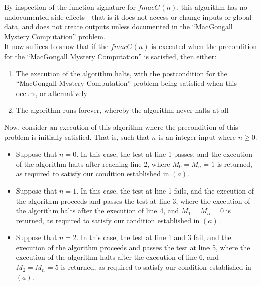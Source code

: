 \documentclass[12pt]{article}
\newenvironment{problem}[2][Problem]{\begin{trivlist}
\item[\hskip \labelsep {\bfseries #1}\hskip \labelsep {\bfseries #2.}]}{\end{trivlist}}
\begin{document}

\begin{problem}{8}

\noindent
By inspection of the function signature for $fmacG(n)$, this algorithm has no undocumented side effects - that is it does not access or change inputs or global data, and does not create outputs unless documented in the “MacGongall Mystery Computation” problem. \\

\noindent
It now suffices to show that if the $fmacG(n)$ is executed when the precondition for the “MacGongall Mystery Computation” is satisfied, then either:
\begin{enumerate}[label=(\alph*)]
\item The execution of the algorithm halts, with the postcondition for the “MacGongall Mystery Computation” problem being satisfied when this occurs, or alternatively
\item The algorithm runs forever, whereby the algorithm never halts at all
\end{enumerate}

\noindent
Now, consider an execution of this algorithm where the precondition of this problem is initially satisfied. That is, such that $n$ is an integer input where $n \geq 0$.

\begin{itemize}

\item Suppose that $n = 0$. In this case, the test at line 1 passes, and the execution of the algorithm halts after reaching line 2, where $M_0 = M_n = 1$ is returned, as required to satisfy our condition established in $(a)$.

\item Suppose that $n = 1$. In this case, the test at line 1 fails, and the execution of the algorithm proceeds and passes the test at line 3, where the execution of the algorithm halts after the execution of line 4, and $M_1 = M_n = 0$ is returned, as required to satisfy our condition established in $(a)$.

\item Suppose that $n = 2$. In this case, the test at line 1 and 3 fail, and the execution of the algorithm proceeds and passes the test at line 5, where the execution of the algorithm halts after the execution of line 6, and $M_2 = M_n = 5$ is returned, as required to satisfy our condition established in $(a)$.


\end{itemize}
\end{problem}
\end{document}
